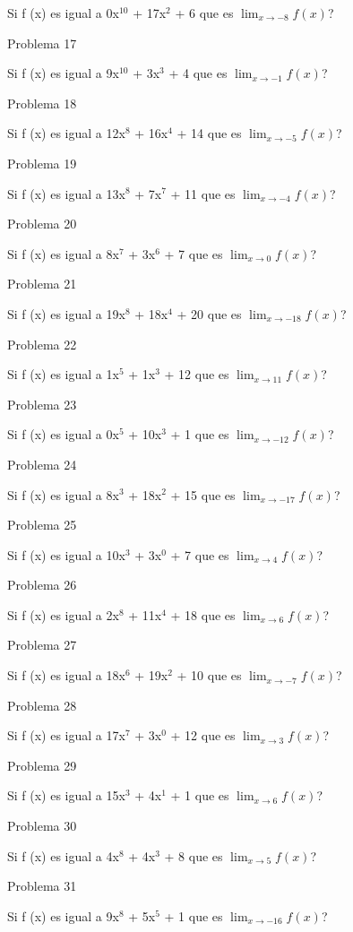 \documentclass{article}
\begin{document}
Si f (x) es igual a 0x$^{10}$ +  17x${^2}$ + 6 que es $\lim_{x\to -8} f(x) $?

Problema 17

Si f (x) es igual a 9x$^{10}$ +  3x${^3}$ + 4 que es $\lim_{x\to -1} f(x) $?

Problema 18

Si f (x) es igual a 12x$^{8}$ +  16x${^4}$ + 14 que es $\lim_{x\to -5} f(x) $?

Problema 19

Si f (x) es igual a 13x$^{8}$ +  7x${^7}$ + 11 que es $\lim_{x\to -4} f(x) $?

Problema 20

Si f (x) es igual a 8x$^{7}$ +  3x${^6}$ + 7 que es $\lim_{x\to 0} f(x) $?

Problema 21

Si f (x) es igual a 19x$^{8}$ +  18x${^4}$ + 20 que es $\lim_{x\to -18} f(x) $?

Problema 22

Si f (x) es igual a 1x$^{5}$ +  1x${^3}$ + 12 que es $\lim_{x\to 11} f(x) $?

Problema 23

Si f (x) es igual a 0x$^{5}$ +  10x${^3}$ + 1 que es $\lim_{x\to -12} f(x) $?

Problema 24

Si f (x) es igual a 8x$^{3}$ +  18x${^2}$ + 15 que es $\lim_{x\to -17} f(x) $?

Problema 25

Si f (x) es igual a 10x$^{3}$ +  3x${^0}$ + 7 que es $\lim_{x\to 4} f(x) $?

Problema 26

Si f (x) es igual a 2x$^{8}$ +  11x${^4}$ + 18 que es $\lim_{x\to 6} f(x) $?

Problema 27

Si f (x) es igual a 18x$^{6}$ +  19x${^2}$ + 10 que es $\lim_{x\to -7} f(x) $?

Problema 28

Si f (x) es igual a 17x$^{7}$ +  3x${^0}$ + 12 que es $\lim_{x\to 3} f(x) $?

Problema 29

Si f (x) es igual a 15x$^{3}$ +  4x${^1}$ + 1 que es $\lim_{x\to 6} f(x) $?

Problema 30

Si f (x) es igual a 4x$^{8}$ +  4x${^3}$ + 8 que es $\lim_{x\to 5} f(x) $?

Problema 31

Si f (x) es igual a 9x$^{8}$ +  5x${^5}$ + 1 que es $\lim_{x\to -16} f(x) $?
\end{document}
